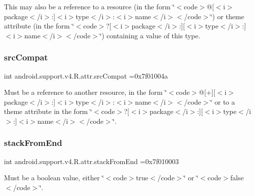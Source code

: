This may also be a reference to a resource (in the form \char`\"{}$<$code$>$@\mbox{[}$<$i$>$package$<$/i$>$\+:\mbox{]}$<$i$>$type$<$/i$>$\+:$<$i$>$name$<$/i$>$$<$/code$>$\char`\"{}) or theme attribute (in the form \char`\"{}$<$code$>$?\mbox{[}$<$i$>$package$<$/i$>$\+:\mbox{]}\mbox{[}$<$i$>$type$<$/i$>$\+:\mbox{]}$<$i$>$name$<$/i$>$$<$/code$>$\char`\"{}) containing a value of this type. \mbox{\label{classandroid_1_1support_1_1v4_1_1R_1_1attr_a575eb70d456063d9e25b233ada1f5e71}} 
\subsubsection{\texorpdfstring{src\+Compat}{srcCompat}}
{\footnotesize\ttfamily int android.\+support.\+v4.\+R.\+attr.\+src\+Compat =0x7f01004a\hspace{0.3cm}{\ttfamily [static]}}

Must be a reference to another resource, in the form \char`\"{}$<$code$>$@\mbox{[}+\mbox{]}\mbox{[}$<$i$>$package$<$/i$>$\+:\mbox{]}$<$i$>$type$<$/i$>$\+:$<$i$>$name$<$/i$>$$<$/code$>$\char`\"{} or to a theme attribute in the form \char`\"{}$<$code$>$?\mbox{[}$<$i$>$package$<$/i$>$\+:\mbox{]}\mbox{[}$<$i$>$type$<$/i$>$\+:\mbox{]}$<$i$>$name$<$/i$>$$<$/code$>$\char`\"{}. \mbox{\label{classandroid_1_1support_1_1v4_1_1R_1_1attr_a3892c5fa02408b8236ce91dc60047e54}} 
\subsubsection{\texorpdfstring{stack\+From\+End}{stackFromEnd}}
{\footnotesize\ttfamily int android.\+support.\+v4.\+R.\+attr.\+stack\+From\+End =0x7f010003\hspace{0.3cm}{\ttfamily [static]}}

Must be a boolean value, either \char`\"{}$<$code$>$true$<$/code$>$\char`\"{} or \char`\"{}$<$code$>$false$<$/code$>$\char`\"{}. 


